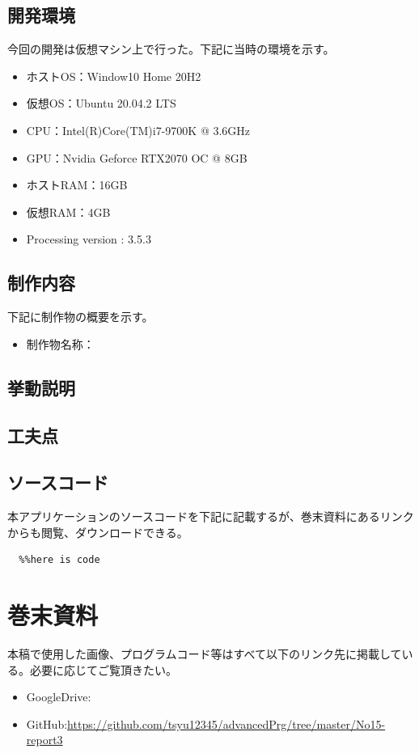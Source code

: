 \documentclass[dvipdfmx]{jsarticle}
\begin{document}
\subsection{開発環境}
今回の開発は仮想マシン上で行った。下記に当時の環境を示す。
\begin{itemize}
  \item ホストOS：Window10 Home 20H2
  \item 仮想OS：Ubuntu 20.04.2 LTS
  \item CPU：Intel(R)Core(TM)i7-9700K @ 3.6GHz
  \item GPU：Nvidia Geforce RTX2070 OC @ 8GB
  \item ホストRAM：16GB
  \item 仮想RAM：4GB
  \item Processing version : 3.5.3
\end{itemize}
\subsection{制作内容}
下記に制作物の概要を示す。
\begin{itemize}
  \item 制作物名称：
\end{itemize}
\subsection{挙動説明}
\subsection{工夫点}
\subsection{ソースコード}
本アプリケーションのソースコードを下記に記載するが、巻末資料にあるリンクからも閲覧、ダウンロードできる。
\begin{verbatim}
  %%here is code
\end{verbatim}
\section{巻末資料}
本稿で使用した画像、プログラムコード等はすべて以下のリンク先に掲載している。必要に応じてご覧頂きたい。
\begin{itemize}
  \item GoogleDrive:\url{}
  \item GitHub:\url{https://github.com/tsyu12345/advancedPrg/tree/master/No15-report3}
\end{itemize}
\end{document}
